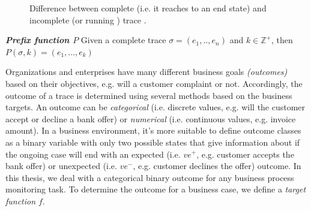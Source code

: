 \begin{figure}[htb]
	\begin{center}
		\caption[Complete and incomplete trace]{Difference between complete (i.e. it reaches to an end state) and incomplete (or running ) trace \cite{teinemaa2019outcome}.}
		\label{fig:runtr}
	\end{center}
\end{figure}

\begin{definition}{\textit{\textbf{Prefix function $P$}}}
	Given a complete trace $\sigma = (e_1, .., e_n)$ and $k \in \mathbb Z^+$, then $P(\sigma, k) = (e_1, ..., e_k)$
	
\end{definition}


Organizations and enterprises have many different business goals \textit{(outcomes)} based on their objectives, e.g. will a customer complaint or not. Accordingly, the outcome of a trace is determined using several methods based on the business targets. An outcome can be \textit{categorical} (i.e. discrete values, e.g. will the customer accept or decline a bank offer) or \textit{numerical} (i.e. continuous values, e.g. invoice amount). In a business environment, it’s more suitable to define outcome classes as a binary variable with only two possible states that give information about if the ongoing case will end with an expected (i.e. $ve^{+}$, e.g. customer accepts the bank offer) or unexpected (i.e. $ve^{-}$, e.g. customer declines the offer)  outcome.  In this thesis, we deal with a categorical binary outcome for any business process monitoring task. To determine the outcome for a business case, we define a \textit{target function $f$}.

